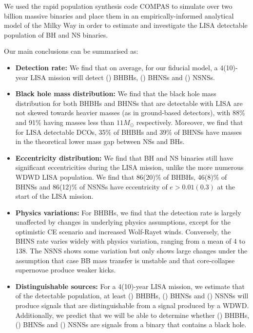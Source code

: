 We used the rapid population synthesis code COMPAS to simulate over two billion massive binaries and place them in an empirically-informed analytical model of the Milky Way in order to estimate and investigate the LISA detectable population of BH and NS binaries.

Our main conclusions can be summarised as:
\begin{itemize}
    \item \textbf{Detection rate:} We find that on average, for our fiducial model, a 4(10)-year LISA mission will detect \BHBHFourYear{}(\BHBHTenYear{}) BHBHs, \BHNSFourYear{}(\BHNSTenYear{}) BHNSs and \NSNSFourYear{}(\NSNSTenYear{}) NSNSs.
    \item \textbf{Black hole mass distribution:} We find that the black hole mass distribution for both BHBHs and BHNSs that are detectable with LISA are not skewed towards heavier masses (as in ground-based detectors), with 88\% and 91\% having masses less than $11 \unit{M_\odot}$ respectively. Moreover, we find that for LISA detectable DCOs, 35\% of BHBHs and 39\% of BHNSs have masses in the theoretical lower mass gap between NSs and BHs.
    \item \textbf{Eccentricity distribution:} We find that BH and NS binaries still have significant eccentricities during the LISA mission, unlike the more numerous WDWD LISA population. We find that 86(20)\% of BHBHs, 46(8)\% of BHNSs and 86(12)\% of NSNSs have eccentricity of $e > 0.01(0.3)$ at the start of the LISA mission.
    \item \textbf{Physics variations:} For BHBHs, we find that the detection rate is largely unaffected by changes in underlying physics assumptions, except for the optimistic CE scenario and increased Wolf-Rayet winds. Conversely, the BHNS rate varies widely with physics variation, ranging from a mean of 4 to 138. The NSNS shows some variation but only shows large changes under the assumption that case BB mass transfer is unstable and that core-collapse supernovae produce weaker kicks.
    \item \textbf{Distinguishable sources:} For a 4(10)-year LISA mission, we estimate that of the detectable population, at least \BHBHNotWDWDFour{}(\BHBHNotWDWDTen{}) BHBHs, \BHNSNotWDWDFour{}(\BHNSNotWDWDTen{}) BHNSs and \NSNSNotWDWDFour{}(\NSNSNotWDWDTen{}) NSNSs will produce signals that are distinguishable from a signal produced by a WDWD. Additionally, we predict that we will be able to determine whether \BHBHDistinguishedFour{}(\BHBHDistinguishedTen{}) BHBHs, \BHNSDistinguishedFour{}(\BHNSDistinguishedTen{}) BHNSs and \NSNSDistinguishedFour{}(\NSNSDistinguishedTen{}) NSNSs are signals from a binary that contains a black hole.

\end{itemize}

